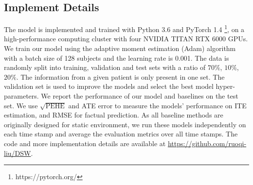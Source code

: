 
\subsection{Implement Details}
The model is implemented and trained with Python 3.6 and PyTorch 1.4 \footnote{https://pytorch.org/}, on a high-performance computing cluster with four NVIDIA TITAN RTX 6000 GPUs. We train our model using the adaptive moment estimation (Adam) algorithm with a batch size of 128 subjects and the learning rate is 0.001. The data is randomly split into training, validation and test sets with a ratio of $70\%$, $10\%$, $20\%$. The information from a given patient is only present in one set. The validation set is used to improve the models and select the best model hyper-parameters. We report the performance of our model and baselines on the test set. We use $\sqrt{\text{PEHE}}$ and ATE error to measure the models' performance on ITE estimation, and RMSE for factual prediction. As all baseline methods are originally designed for static environment, we run these models independently on each time stamp and average the evaluation metrics over all time stamps. The code and more implementation details are available at \url{https://github.com/ruoqi-liu/DSW}.



